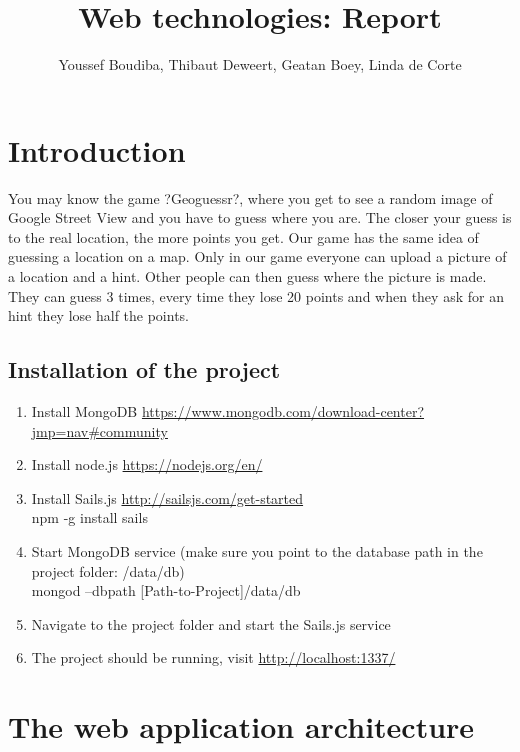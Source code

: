 \documentclass[11pt, oneside]{article}   	%
\title{Web technologies: Report}
\author{Youssef Boudiba, Thibaut Deweert, Geatan Boey, Linda de Corte }
\date{}							%
\begin{document}
\maketitle
\clearpage

\tableofcontents
\clearpage


\section{Introduction}
You may know the game ?Geoguessr?, where you get to see a random image of Google Street View and you have to guess where you are. The closer your guess is to the real location, the more points you get. Our game has the same idea of guessing a location on a map. Only in our game everyone can upload a picture of a location and a hint. Other people can then guess where the picture is made. They can guess 3 times, every time they lose 20 points and when they ask for an hint they lose half the points.

\subsection{Installation of the project}
\begin{enumerate}
\item Install MongoDB \url{https://www.mongodb.com/download-center?jmp=nav#community} 
\item  Install node.js \url{https://nodejs.org/en/}
\item Install Sails.js \url{http://sailsjs.com/get-started} \\
 npm -g install sails 
\item Start MongoDB service (make sure you point to the database path in the project folder: /data/db) \\ 
mongod --dbpath [Path-to-Project]/data/db
\item Navigate to the project folder and start the Sails.js service
\item The project should be running, visit \url{http://localhost:1337/ }

\end{enumerate}

\section{ The web application architecture}
\end{document}
